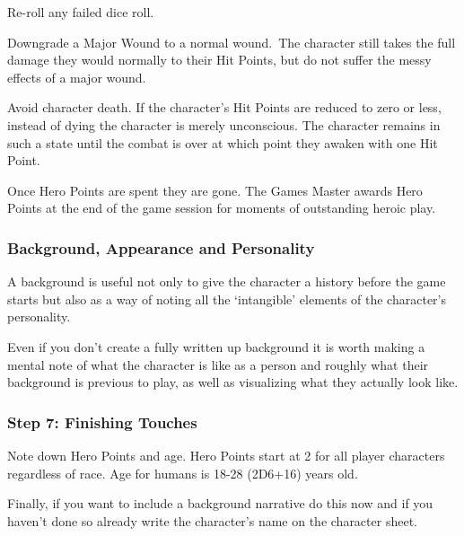 \begin{rpg-list}
	\item Re-roll any failed dice roll.
	\item Downgrade a Major Wound to a normal wound. The character still takes the full damage they would normally to their Hit Points, but do not suffer the messy effects of a major wound.
	\item Avoid character death. If the character’s Hit Points are reduced to zero or less, instead of dying the character is merely unconscious. The character remains in such a state until the combat is over at which point they awaken with one Hit Point.
\end{rpg-list}

Once Hero Points are spent they are gone. The Games Master awards Hero Points at the end of the game session for moments of outstanding heroic play.

\subsubsection{Background, Appearance and Personality}
A background is useful not only to give the character a history before the game starts but also as a way of noting all the ‘intangible’ elements of the character’s personality. 

Even if you don’t create a fully written up background it is worth making a mental note of what the character is like as a person and roughly what their background is previous to play, as well as visualizing what they actually look like. 

\subsubsection{Step 7: Finishing Touches}
Note down Hero Points and age. Hero Points start at 2 for all player characters regardless of race. Age for humans is 18-28 (2D6+16) years old.

Finally, if you want to include a background narrative do this now and if you haven’t done so already write the character’s name on the character sheet.


